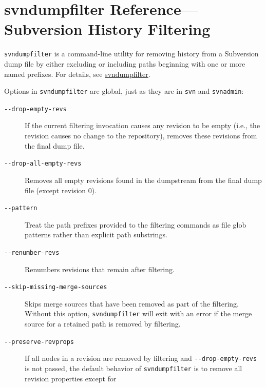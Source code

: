 \chapter{svndumpfilter Reference---Subversion History
Filtering}\label{svn.ref.svndumpfilter}

\texttt{svndumpfilter} is a command-line utility for removing history
from a Subversion dump file by either excluding or including paths
beginning with one or more named prefixes. For details, see
\hyperref[svn.reposadmin.maint.tk.svndumpfilter]{svndumpfilter}.

Options in \texttt{svndumpfilter} are global, just as they are in
\texttt{svn} and \texttt{svnadmin}:

\protect{}\label{svn.ref.svndumpfilter.sw}{}

\begin{description}
\item[\protect{}\label{svn.ref.svndumpfilter.sw.drop_empty_revs}{}\texttt{-\/-drop-empty-revs}]
If the current filtering invocation causes any revision to be empty
(i.e., the revision causes no change to the repository), removes these
revisions from the final dump file.
\item[\protect{}\label{svn.ref.svndumpfilter.sw.drop_all_empty_revs}{}\texttt{-\/-drop-all-empty-revs}]
Removes all empty revisions found in the dumpstream from the final dump
file (except revision 0).
\item[\protect{}\label{svn.ref.svndumpfilter.sw.pattern}{}\texttt{-\/-pattern}]
Treat the path prefixes provided to the filtering commands as file glob
patterns rather than explicit path substrings.
\item[\protect{}\label{svn.ref.svndumpfilter.sw.renumber_revs}{}\texttt{-\/-renumber-revs}]
Renumbers revisions that remain after filtering.
\item[\protect{}\label{svn.ref.svndumpfilter.sw.skip_missing_merge_sources}{}\texttt{-\/-skip-missing-merge-sources}]
Skips merge sources that have been removed as part of the filtering.
Without this option, \texttt{svndumpfilter} will exit with an error if
the merge source for a retained path is removed by filtering.
\item[\protect{}\label{svn.ref.svndumpfilter.sw.preserve_revprops}{}\texttt{-\/-preserve-revprops}]
If all nodes in a revision are removed by filtering and
\texttt{-\/-drop-empty-revs} is not passed, the default behavior of
\texttt{svndumpfilter} is to remove all revision properties except for

\end{description}
